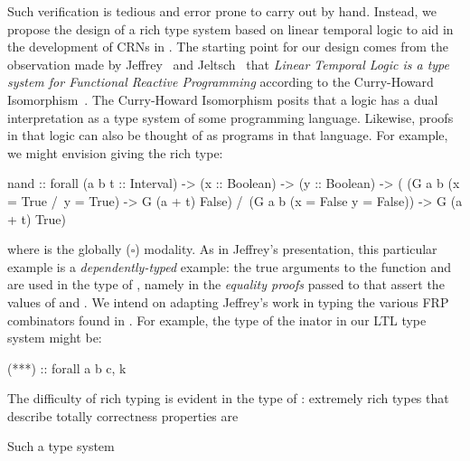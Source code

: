 Such verification is tedious and error prone to carry out by hand.
Instead, we propose the design of a rich type system based on linear temporal logic to aid in the development of CRNs in \reactamole.
The starting point for our design comes from the observation made by Jeffrey~\cite{jeffrey2012} and Jeltsch~\cite{jeltsch:2011:talk} that \emph{Linear Temporal Logic is a type system for Functional Reactive Programming} according to the Curry-Howard Isomorphism~\cite{howard:1980:isomorphism}.
The Curry-Howard Isomorphism posits that a logic has a dual interpretation as a type system of some programming language.
Likewise, proofs in that logic can also be thought of as programs in that language.
For example, we might envision giving  the rich type:
\begin{haskellcode}
nand :: forall (a b t :: Interval) -> (x :: Boolean) -> (y :: Boolean)
          -> (  (G a b (x = True /\ y = True) -> G (a + t) False)
             /\ (G a b (x = False \/ y = False)) -> G (a + t) True)
           \end{haskellcode}
where  is the globally (\( \square \)) modality.
As in Jeffrey's presentation, this particular example is a \emph{dependently-typed} example: the true arguments to the function  and  are used in the type of , namely in the \emph{equality proofs} passed to  that assert the values of  and .
We intend on adapting Jeffrey's work in typing the various FRP combinators found in \reactamole.
For example, the type of the inator \hask{(>>>)} in our LTL type system might be:
\begin{haskellcode}
  (***) :: forall a b c, k
\end{haskellcode}

The difficulty of rich typing is evident in the type of : extremely rich types that describe totally correctness properties are


Such a type system


